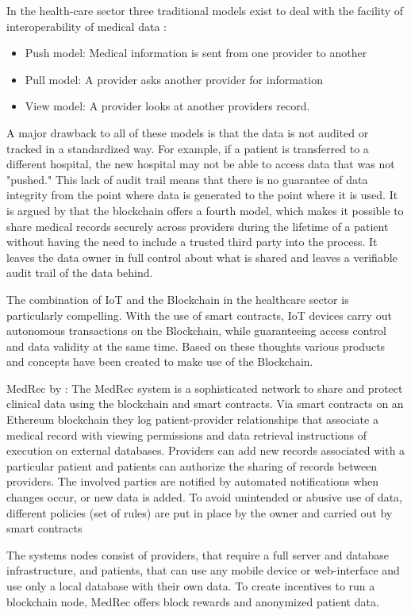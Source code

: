 In the health-care sector three traditional models exist to deal with the facility of interoperability of medical data \cite{Kshetri2017}:
\begin{itemize}
	\item Push model: Medical information is sent from one provider to another
	\item Pull model: A provider asks another provider for information
	\item View model: A provider looks at another providers record.
\end{itemize}
A major drawback to all of these models is that the data is not audited or tracked in a standardized way. For example, if a patient is transferred to a different hospital, the new hospital may not be able to access data that was not "pushed." This lack of audit trail means that there is no guarantee of data integrity from the point where data is generated to the point where it is used.
It is argued by \cite{Kshetri2017} that the blockchain offers a fourth model, which makes it possible to share medical records securely across providers during the lifetime of a patient without having the need to include a trusted third party into the process. It leaves the data owner in full control about what is shared and leaves a verifiable audit trail of the data behind.

The combination of IoT and the Blockchain in the healthcare sector is particularly compelling. With the use of smart contracts, IoT devices carry out autonomous transactions on the Blockchain, while guaranteeing access control and data validity at the same time. Based on these thoughts various products and concepts have been created to make use of the Blockchain.


MedRec by \citeauthor{Azaria2016}:
The MedRec system is a sophisticated network to share and protect clinical data using the blockchain and smart contracts. Via smart contracts on an Ethereum blockchain they log patient-provider relationships that associate a medical record with viewing permissions and data retrieval instructions of execution on external databases.
Providers can add new records associated with a particular patient and patients can authorize the sharing of records between providers. The involved parties are notified by automated notifications when changes occur, or new data is added.
To avoid unintended or abusive use of data, different policies (set of rules) are put in place by the owner and carried out by smart contracts

The systems nodes consist of providers, that require a full server and database infrastructure, and patients, that can use any mobile device or web-interface and use only a local database with their own data.
To create incentives to run a blockchain node, MedRec offers block rewards and anonymized patient data.


